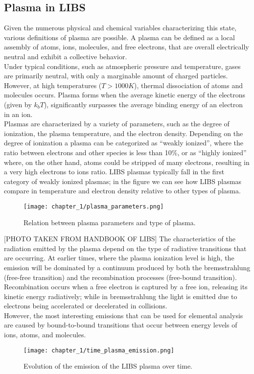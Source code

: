 \subsection{Plasma in LIBS}
\label{subsec:plasma_in_libs}
Given the numerous physical and chemical variables characterizing this state, various definitions of plasma are possible. A plasma can be defined as a local assembly of atoms, ions, molecules, and free electrons, that are overall electrically neutral and exhibit a collective behavior.
\\
Under typical conditions, such as atmospheric pressure and temperature, gases are primarily neutral, with only a marginable amount of charged particles. However, at high temperatures ($T > 1000K$), thermal dissociation of atoms and molecules occurs. Plasma forms when the average kinetic energy of the electrons (given by $k_bT$), significantly surpasses the average binding energy of an electron in an ion.
\\
Plasmas are characterized by a variety of parameters, such as the degree of ionization, the plasma temperature, and the electron density. Depending on the degree of ionization a plasma can be categorized as “weakly ionized”, where the ratio between electrons and other species is less than 10\%, or as “highly ionized” where, on the other hand, atoms could be stripped of many electrons, resulting in a very high electrons to ions ratio. LIBS plasmas typically fall in the first category of weakly ionized plasmas; in the figure we can see how LIBS plasmas compare in temperature and electron density relative to other types of plasma.
\begin{figure}[H]
    \centering
    \texttt{[image: chapter\_1/plasma\_parameters.png]}
    \label{fig:plasma_parameters}
    \\[40pt]
    \caption{Relation between plasma parameters and type of plasma.}
\end{figure}
[PHOTO TAKEN FROM HANDBOOK OF LIBS]
The characteristics of the radiation emitted by the plasma depend on the type of radiative transitions that are occurring. At earlier times, where the plasma ionization level is high, the emission will be dominated by a continuum produced by both the bremsstrahlung (free-free transition) and the recombination processes (free-bound transition). Recombination occurs when a free electron is captured by a free ion, releasing its kinetic energy radiatively; while in bremsstrahlung the light is emitted due to electrons being accelerated or decelerated in collisions.
\\
However, the most interesting emissions that can be used for elemental analysis are caused by bound-to-bound transitions that occur between energy levels of ions, atoms, and molecules. 
\begin{figure}[H]
    \centering
    \texttt{[image: chapter\_1/time\_plasma\_emission.png]}
    \label{fig:time_plasma_emission}
    \\[20pt]
    \caption{Evolution of the emission of the LIBS plasma over time.}
\end{figure}

